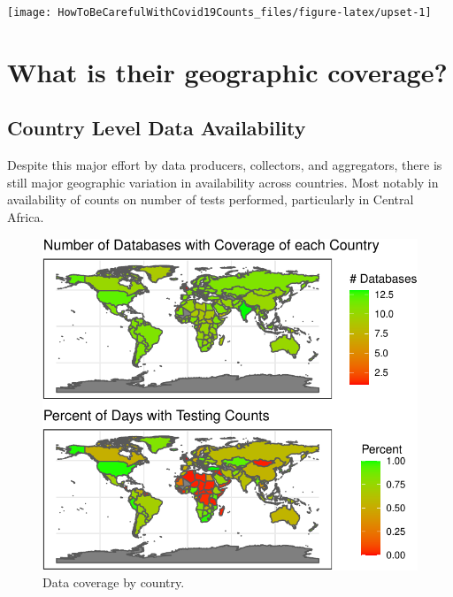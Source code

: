 \documentclass[
]{book}
\begin{document}
\begin{center}\texttt{[image: HowToBeCarefulWithCovid19Counts\_files/figure-latex/upset-1]} \end{center}

\hypertarget{what-is-their-geographic-coverage}{%
\section{What is their geographic coverage?}\label{what-is-their-geographic-coverage}}

\hypertarget{country-level-data-availability}{%
\subsection{Country Level Data Availability}\label{country-level-data-availability}}

Despite this major effort by data producers, collectors, and aggregators, there is still major geographic variation in availability across countries. Most notably in availability of counts on number of tests performed, particularly in Central Africa.

\begin{figure}

{\centering \includegraphics{HowToBeCarefulWithCovid19Counts_files/figure-latex/nice-fig2-1} 

}

\caption{Data coverage by country.}\label{fig:nice-fig2}
\end{figure}
\end{document}
